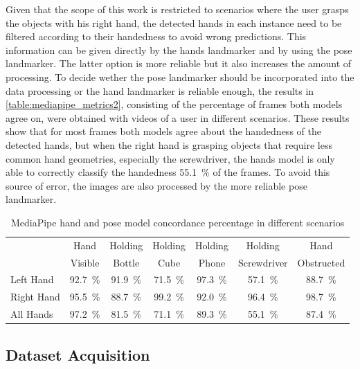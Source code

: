 Given that the scope of this work is restricted to scenarios where the user grasps the objects with his right hand, the detected hands in each instance need to be filtered according to their handedness to avoid wrong predictions. This information can be given directly by the hands landmarker and by using the pose landmarker. The latter option is more reliable but it also increases the amount of processing. To decide wether the pose landmarker should be incorporated into the data processing or the hand landmarker is reliable enough, the results in \autoref{table:mediapipe_metrics2}, consisting of the percentage of frames both models agree on, were obtained with videos of a user in different scenarios. These results show that for most frames both models agree about the handedness of the detected hands, but when the right hand is grasping objects that require less common hand geometries, especially the screwdriver, the hands model is only able to correctly classify the handedness \SI{55.1}{\percent} of the frames. To avoid this source of error, the images are also processed by the more reliable pose landmarker.

\begin{table}[ht]
    \centering
    \caption{MediaPipe hand and pose model concordance percentage in different scenarios}
    \label{table:mediapipe_metrics2}
    \begin{tabular}{lcccccc}
        \toprule
        & Hand\multirow{2}{*}{} & Holding\multirow{2}{*}{} & Holding\multirow{2}{*}{} & Holding\multirow{2}{*}{} & Holding\multirow{2}{*}{} & Hand\multirow{2}{*}{} \\
        & Visible & Bottle & Cube & Phone & Screwdriver & Obstructed \\
        \midrule
        Left Hand & \SI{92.7}{\percent} & \SI{91.9}{\percent} & \SI{71.5}{\percent} & \SI{97.3}{\percent} & \SI{57.1}{\percent} & \SI{88.7}{\percent} \\
        Right Hand & \SI{95.5}{\percent} & \SI{88.7}{\percent} & \SI{99.2}{\percent} & \SI{92.0}{\percent} & \SI{96.4}{\percent} & \SI{98.7}{\percent} \\
        All Hands & \SI{97.2}{\percent} & \SI{81.5}{\percent} & \SI{71.1}{\percent} & \SI{89.3}{\percent} & \SI{55.1}{\percent} & \SI{87.4}{\percent} \\
        \bottomrule
    \end{tabular}
\end{table}

\subsection{Dataset Acquisition}

